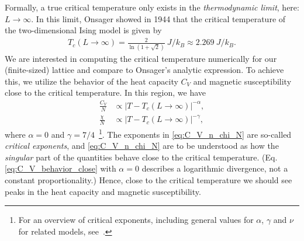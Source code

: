 \documentclass[english,notitlepage,reprint]{revtex4-2}  %
\begin{document}
Formally, a true critical temperature only exists in the \emph{thermodynamic limit}, here: \(L \to \infty\). In this limit, Onsager showed in 1944 that the critical temperature of the two-dimensional Ising model is given by~\cite{LarsOnsager}
\begin{align}
    T_c (L\rightarrow \infty) = \frac{2}{\ln(1 + \sqrt{2})} \ \si{J/k_B} \approx 2.269 \ \si{J/k_B}.    \label{eq:T_c_infintie}
\end{align}
We are interested in computing the critical temperature numerically for our (finite-sized) lattice and compare to Onsager's analytic expression. To achieve this, we utilize the behavior of the heat capacity \(C_V\) and magnetic susceptibility close to the critical temperature. In this region, we have 
\begin{subequations}    \label{eq:C_V_n_chi_N}
    \begin{align}
        \frac{C_V}{N} &\propto |T - T_c(L\rightarrow\infty)|^{-\alpha}, \label{eq:C_V_behavior_close}\\ 
        \frac{\chi}{N} &\propto |T - T_c(L\rightarrow\infty)|^{-\gamma},  \label{eq:chi_behavior_close}
    \end{align}
\end{subequations}
where \(\alpha = 0\) and \(\gamma=7/4\)~\footnote{For an overview of critical exponents, including general values for \(\alpha\), \(\gamma\) and \(\nu\) for related models, see~\cite{BERCHE2009493}.}. 
The exponents in \eqref{eq:C_V_n_chi_N} are so-called \emph{critical exponents}, and \eqref{eq:C_V_n_chi_N} are to be understood as how the \emph{singular} part of the quantities behave close to the critical temperature. 
(Eq. \eqref{eq:C_V_behavior_close} with \(\alpha=0\) describes a logarithmic divergence, not a constant proportionality.)
Hence, close to the critical temperature we should see peaks in the heat capacity and magnetic susceptibility.
\end{document}
